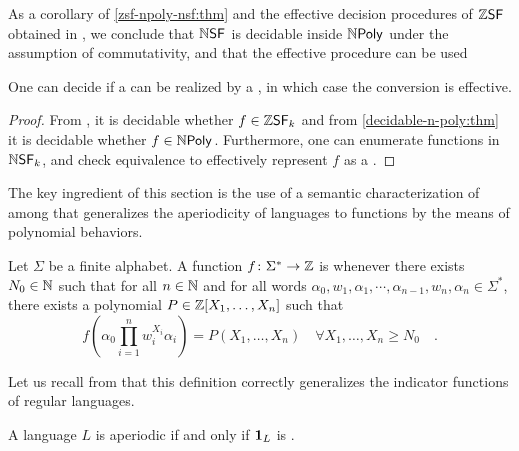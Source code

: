 As a corollary of \cref{zsf-npoly-nsf:thm} and the effective decision
procedures of $\ZSF$ obtained in \cite{LOPEZ23b}, we conclude that $\NSF$ is
decidable inside $\NPoly$ under the assumption of commutativity,
and that the effective procedure can be used 

\begin{corollary}
    One can decide if a  
    can be realized by a ,
    in which case the conversion is effective.
\end{corollary}
\begin{proof}
    From \cite[Theorem V.13]{LOPEZ23b}, it is decidable whether
    $f \in \ZSF[k]$ and from \cref{decidable-n-poly:thm}
    it is decidable whether $f \in \NPoly$.
    Furthermore, one can enumerate functions in $\NSF[k]$,
    and check equivalence to effectively represent $f$ as a
    .
\end{proof}

The key ingredient of this section is the use of a semantic characterization of
 among 
that generalizes the aperiodicity of languages to functions by the means of
polynomial behaviors.

\begin{definition}
    \label{ultimately-polynomial:def}
    Let $\Sigma$ be a finite alphabet. 
    A function $f \colon \Sigma^* \to \mathbb{Z}$
    is 
    whenever there exists $N_0 \in \mathbb{N}$ such that
    for all $n \in \mathbb{N}$
    and for all words $\alpha_0, w_1, \alpha_1, \cdots, \alpha_{n-1}, w_n, \alpha_n
    \in \Sigma^*$, there exists a polynomial $P \in \mathbb{Z}[X_1, \dots, X_n]$
    such that
    \begin{equation*}
        f\left(
            \alpha_0 \prod_{i = 1}^{n} w_i^{X_i} \alpha_i
        \right)
        = 
        P(X_1, \dots, X_n)
        \quad 
        \forall X_1, \dots, X_n \geq N_0
        \quad .
    \end{equation*}
\end{definition}


Let us recall from \cite{LOPEZ23b} that this definition correctly
generalizes the indicator functions of regular languages.

\begin{example}
    A language $L$ is aperiodic if and only if 
    $\mathbf{1}_{L}$ is .
\end{example}

